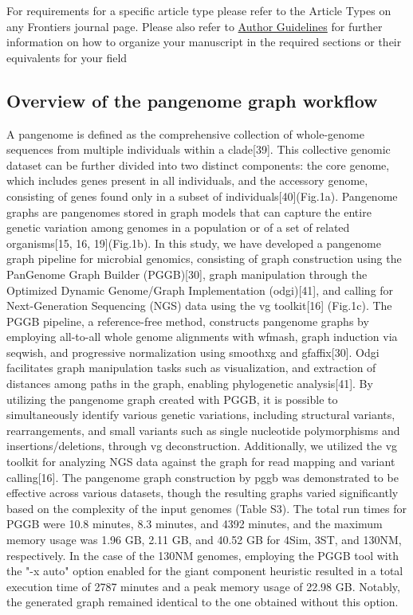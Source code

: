 For requirements for a specific article type please refer to the Article Types on any Frontiers journal page. Please also refer to  \href{http://home.frontiersin.org/about/author-guidelines#Sections}{Author Guidelines} for further information on how to organize your manuscript in the required sections or their equivalents for your field
\subsection{Overview of the pangenome graph workflow}
A pangenome is defined as the comprehensive collection of whole-genome sequences from multiple individuals within a clade[39]. This collective genomic dataset can be further divided into two distinct components: the core genome, which includes genes present in all individuals, and the accessory genome, consisting of genes found only in a subset of individuals[40](Fig.1a). Pangenome graphs are pangenomes stored in graph models that can capture the entire genetic variation among genomes in a population or of a set of related organisms[15, 16, 19](Fig.1b). 
In this study, we have developed a pangenome graph pipeline for microbial genomics, consisting of graph construction using the PanGenome Graph Builder (PGGB)[30], graph manipulation through the Optimized Dynamic Genome/Graph Implementation (odgi)[41], and calling for Next-Generation Sequencing (NGS) data using the vg toolkit[16] (Fig.1c). The PGGB pipeline, a reference-free method, constructs pangenome graphs by employing all-to-all whole genome alignments with wfmash, graph induction via seqwish, and progressive normalization using smoothxg and gfaffix[30]. Odgi facilitates graph manipulation tasks such as visualization, and extraction of distances among paths in the graph, enabling phylogenetic analysis[41]. By utilizing the pangenome graph created with PGGB, it is possible to simultaneously identify various genetic variations, including structural variants, rearrangements, and small variants such as single nucleotide polymorphisms and insertions/deletions, through vg deconstruction. Additionally, we utilized the vg toolkit for analyzing NGS data against the graph for read mapping and variant calling[16]. 
The pangenome graph construction by pggb was demonstrated to be effective across various datasets, though the resulting graphs varied significantly based on the complexity of the input genomes (Table S3). The total run times for PGGB were 10.8 minutes, 8.3 minutes, and 4392 minutes, and the maximum memory usage was 1.96 GB, 2.11 GB, and 40.52 GB for 4Sim, 3ST, and 130NM, respectively. In the case of the 130NM genomes, employing the PGGB tool with the "-x auto" option enabled for the giant component heuristic resulted in a total execution time of 2787 minutes and a peak memory usage of 22.98 GB. Notably, the generated graph remained identical to the one obtained without this option. 

